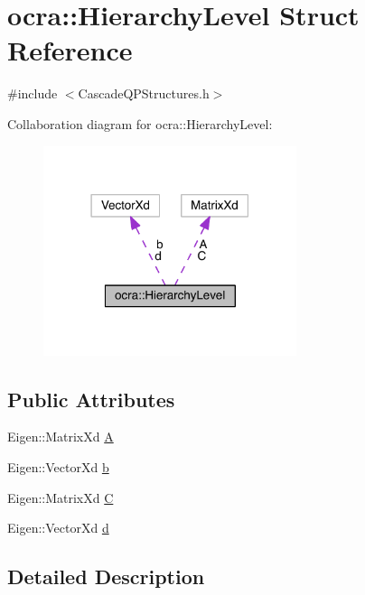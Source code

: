 \hypertarget{structocra_1_1HierarchyLevel}{}\section{ocra\+:\+:Hierarchy\+Level Struct Reference}
\label{structocra_1_1HierarchyLevel}


{\ttfamily \#include $<$Cascade\+Q\+P\+Structures.\+h$>$}



Collaboration diagram for ocra\+:\+:Hierarchy\+Level\+:\nopagebreak
\begin{figure}[H]
\begin{center}
\leavevmode
\includegraphics[width=210pt]{d4/d30/structocra_1_1HierarchyLevel__coll__graph}
\end{center}
\end{figure}
\subsection*{Public Attributes}
\begin{DoxyCompactItemize}
\item 
Eigen\+::\+Matrix\+Xd \hyperlink{structocra_1_1HierarchyLevel_a19bc3f9c063348621857c7bcc5c391c7}{A}
\item 
Eigen\+::\+Vector\+Xd \hyperlink{structocra_1_1HierarchyLevel_aedcf136bbf54aa0ff910b3a3ce3d43be}{b}
\item 
Eigen\+::\+Matrix\+Xd \hyperlink{structocra_1_1HierarchyLevel_ad33118f78c391492062c6b3687c2e20d}{C}
\item 
Eigen\+::\+Vector\+Xd \hyperlink{structocra_1_1HierarchyLevel_ad1c6f525af33862743514fd5cf3e8c76}{d}
\end{DoxyCompactItemize}


\subsection{Detailed Description}


